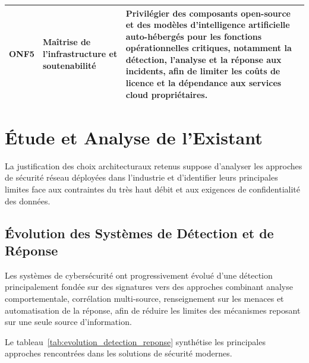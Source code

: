 \begin{longtable}{|p{}|p{}|p{}|}
ONF5 &
\textbf{Maîtrise de l'infrastructure et soutenabilité} &
Privilégier des composants open-source et des modèles d'intelligence artificielle auto-hébergés pour les fonctions opérationnelles critiques, notamment la détection, l'analyse et la réponse aux incidents, afin de limiter les coûts de licence et la dépendance aux services cloud propriétaires. \\ \hline

\end{longtable}

\section{Étude et Analyse de l'Existant}

La justification des choix architecturaux retenus suppose d'analyser les
approches de sécurité réseau déployées dans l'industrie et d'identifier leurs
principales limites face aux contraintes du très haut débit et aux exigences
de confidentialité des données.

\subsection{Évolution des Systèmes de Détection et de Réponse}

Les systèmes de cybersécurité ont progressivement évolué d'une détection
principalement fondée sur des signatures vers des approches combinant
analyse comportementale, corrélation multi-source, renseignement sur les
menaces et automatisation de la réponse, afin de réduire les limites des
mécanismes reposant sur une seule source d'information.

Le tableau~\ref{tab:evolution_detection_reponse} synthétise les principales
approches rencontrées dans les solutions de sécurité modernes.

